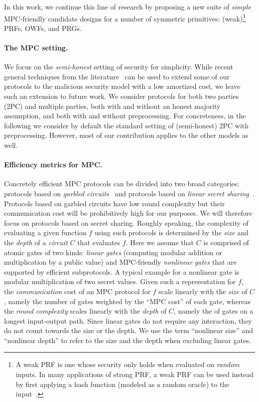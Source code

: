 In this work, we continue this line of research by proposing a new suite of \textit{simple} MPC-friendly candidate designs for a number of symmetric primitives: (weak)\footnote{A weak PRF is one whose security only holds when evaluated on {\em random} inputs. In many applications of strong PRF, a weak PRF can be used instead by first applying a hash function (modeled as a random oracle) to the input~\cite{someweakPRFref}.
} PRFs, OWFs, and PRGs.


\paragraph{The MPC setting.} We focus on the {\em semi-honest} setting of security for simplicity. While recent general techniques from the literature~\cite{BBCGI19,BGIN19} can be used to extend some of our protocols to the malicious security model with a low amortized cost, we leave such an extension to future work. We consider protocols for both two parties (2PC) and multiple parties, both with and without an honest majority assumption, and both with and without preprocessing. For concreteness, in the following we consider by default the standard setting of (semi-honest) 2PC with preprocessing. However, most of our contribution applies to the other models as well. 

\paragraph{Efficiency metrics for MPC.}   Concretely efficient MPC protocols can be divided into two broad categories: protocols based on {\em garbled circuits}~\cite{Yao} and protocols based on {\em linear secret sharing}~\cite{GMW,BGW,CCD}. Protocols based on garbled circuits have low round complexity but their communication cost will be prohibitively high for our purposes. We will therefore focus on protocols based on secret sharing. Roughly speaking, the complexity of evaluating  a given function $f$ using such protocols is determined by the {\em size} and the {\em depth} of a {\em circuit} $C$ that evaluates $f$.  Here we assume that $C$ is comprised of atomic gates of two kinds: {\em linear gates} (computing modular addition or multiplication by a public value) and MPC-friendly {\em nonlinear gates}  that are supported by efficient subprotocols. A typical example for a nonlinear gate is modular multiplication of two secret values. Given such a representation for $f$, the {\em communication} cost of an MPC protocol for $f$ scale linearly with the {\em size} of $C$, namely the number of gates weighted by the ``MPC cost'' of each gate, whereas the {\em round complexity} scales linearly with the {\em depth} of $C$, namely the of gates on a longest input-output path. Since linear gates do not require any interaction, they do not count towards the size or the depth. We use the term ``nonlinear size'' and ``nonlinear depth'' to refer to the size and the depth when excluding linear gates. 

